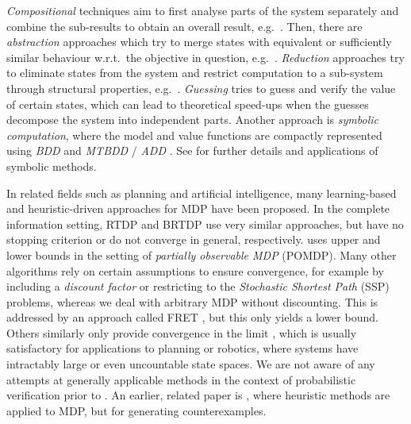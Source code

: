 \documentclass{theoretics}
\begin{document}
\emph{Compositional} techniques aim to first analyse parts of the system separately and combine the sub-results to obtain an overall result, e.g.\  \cite{DBLP:conf/qest/CaillaudDLLPW10,DBLP:journals/scp/DengH13,DBLP:conf/concur/HermannsKK13,DBLP:conf/concur/BassetKW14,DBLP:journals/fmsd/ChatterjeeCD15,DBLP:journals/iandc/BassetKW18}.
Then, there are \emph{abstraction} approaches which try to merge states with equivalent or sufficiently similar behaviour w.r.t.\ the objective in question, e.g.\  \cite{DBLP:conf/papm/DArgenioJJL02,DBLP:conf/cav/HermannsWZ08,DBLP:conf/tacas/HahnHWZ10,DBLP:journals/fmsd/KattenbeltKNP10,DBLP:conf/tacas/HahnHWZ10}.
\emph{Reduction} approaches try to eliminate states from the system and restrict computation to a sub-system through structural properties, e.g.\  \cite{DBLP:conf/qest/BaierGC04,DBLP:journals/entcs/BaierDG06,DBLP:conf/qest/CiesinskiBGK08,DBLP:conf/qest/DiazBEF12,DBLP:conf/fm/FanHM18,DBLP:conf/concur/BonnelandJLMS19}.
\emph{Guessing} \cite{DBLP:conf/soda/ChatterjeeMSS23} tries to guess and verify the value of certain states, which can lead to theoretical speed-ups when the guesses decompose the system into independent parts.
Another approach is \emph{symbolic computation}, where the model and value functions are compactly represented using \emph{BDD} \cite{DBLP:journals/tc/Bryant86} and \emph{MTBDD} / \emph{ADD} \cite{DBLP:journals/fmsd/BaharFGHMPS97,DBLP:journals/fmsd/FujitaMY97}.
See \cite{DBLP:conf/concur/BaierKH99,DBLP:journals/sttt/KwiatkowskaNP04,DBLP:conf/aaai/ZamaniSF12,DBLP:conf/qest/WimmerBBHCHDT10,DBLP:journals/corr/BohyBR14a,DBLP:conf/tacas/0001BCDDKM016} for further details and applications of symbolic methods.

In related fields such as planning and artificial intelligence, many learning-based and heuristic-driven approaches for MDP have been proposed.
In the complete information setting, RTDP \cite{DBLP:journals/ai/BartoBS95} and BRTDP \cite{DBLP:conf/icml/McMahanLG05} use very similar approaches, but have no stopping criterion or do not converge in general, respectively.
\cite{DBLP:conf/ijcai/PineauGT03} uses upper and lower bounds in the setting of \emph{partially observable MDP} (POMDP).
Many other algorithms rely on certain assumptions to ensure convergence, for example by including a \emph{discount factor} \cite{DBLP:journals/ml/KearnsMN02} or restricting to the \emph{Stochastic Shortest Path} (SSP) problems, whereas we deal with arbitrary MDP without discounting.
This is addressed by an approach called FRET \cite{DBLP:conf/aips/KolobovMWG11}, but this only yields a lower bound.
Others similarly only provide convergence in the limit \cite{DBLP:journals/corr/abs-1909-07299,DBLP:journals/corr/JonesAKSB15}, which is usually satisfactory for applications to planning or robotics, where systems have intractably large or even uncountable state spaces.
We are not aware of any attempts at generally applicable methods in the context of probabilistic verification prior to \cite{DBLP:conf/atva/BrazdilCCFKKPU14}.
An earlier, related paper is \cite{DBLP:conf/qest/AljazzarL09}, where heuristic methods are applied to MDP, but for generating counterexamples.
\end{document}
